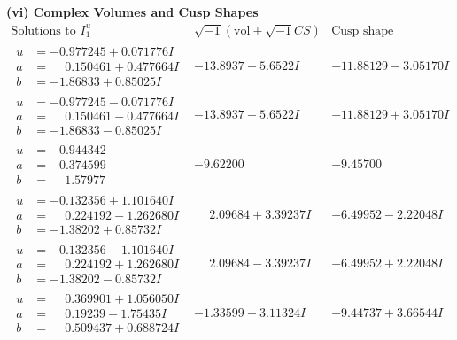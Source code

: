 \documentclass[1p]{elsarticle_modified}
\theoremstyle{definition}
\newcommand{\I}{\sqrt{-1}}
\begin{document}
\newpage\flushleft \textbf{(vi) Complex Volumes and Cusp Shapes}
$$\begin{array}{c|c|c}  
\text{Solutions to }I^u_{1}& \I (\text{vol} + \sqrt{-1}CS) & \text{Cusp shape}\\
 \hline 
\begin{aligned}
u &= -0.977245 + 0.071776 I \\
a &= \phantom{-}0.150461 + 0.477664 I \\
b &= -1.86833 + 0.85025 I\end{aligned}
 & -13.8937 + 5.6522 I & -11.88129 - 3.05170 I \\ \hline\begin{aligned}
u &= -0.977245 - 0.071776 I \\
a &= \phantom{-}0.150461 - 0.477664 I \\
b &= -1.86833 - 0.85025 I\end{aligned}
 & -13.8937 - 5.6522 I & -11.88129 + 3.05170 I \\ \hline\begin{aligned}
u &= -0.944342\phantom{ +0.000000I} \\
a &= -0.374599\phantom{ +0.000000I} \\
b &= \phantom{-}1.57977\phantom{ +0.000000I}\end{aligned}
 & -9.62200\phantom{ +0.000000I} & -9.45700\phantom{ +0.000000I} \\ \hline\begin{aligned}
u &= -0.132356 + 1.101640 I \\
a &= \phantom{-}0.224192 - 1.262680 I \\
b &= -1.38202 + 0.85732 I\end{aligned}
 & \phantom{-}2.09684 + 3.39237 I & -6.49952 - 2.22048 I \\ \hline\begin{aligned}
u &= -0.132356 - 1.101640 I \\
a &= \phantom{-}0.224192 + 1.262680 I \\
b &= -1.38202 - 0.85732 I\end{aligned}
 & \phantom{-}2.09684 - 3.39237 I & -6.49952 + 2.22048 I \\ \hline\begin{aligned}
u &= \phantom{-}0.369901 + 1.056050 I \\
a &= \phantom{-}0.19239 - 1.75435 I \\
b &= \phantom{-}0.509437 + 0.688724 I\end{aligned}
 & -1.33599 - 3.11324 I & -9.44737 + 3.66544 I \\ \hline\begin{aligned}

\end{aligned}
\end{array}$$
\end{document}
